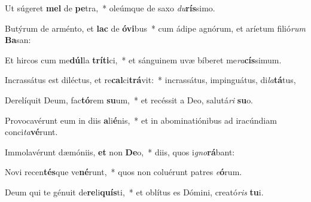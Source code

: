 \item Ut súgeret \textbf{mel} de \textbf{pe}tra,~* oleúmque de saxo \textit{du}\textbf{rís}simo.
\item Butýrum de arménto, et \textbf{lac} de \textbf{ó}\textbf{vi}bus~* cum ádipe agnórum, et aríetum filió\textit{rum} \textbf{Ba}san:
\item Et hircos cum me\textbf{dúl}la \textbf{trí}\textbf{ti}ci,~* et sánguinem uvæ bíberet me\textit{ra}\textbf{cís}simum.
\item Incrassátus est diléctus, et re\textbf{cal}ci\textbf{trá}vit:~* incrassátus, impinguátus, di\textit{la}\textbf{tá}tus,
\item Derelíquit Deum, fac\textbf{tó}rem \textbf{su}um,~* et recéssit a Deo, salutá\textit{ri} \textbf{su}o.
\item Provocavérunt eum in diis \textbf{a}li\textbf{é}nis,~* et in abominatiónibus ad iracúndiam conci\textit{ta}\textbf{vé}runt.
\item Immolavérunt dæmóniis, \textbf{et} non \textbf{De}o,~* diis, quos i\textit{gno}\textbf{rá}bant:
\item Novi recen\textbf{tés}que ve\textbf{né}runt,~* quos non coluérunt patres \textit{e}\textbf{ó}rum.
\item Deum qui te génuit de\textbf{re}li\textbf{quís}ti,~* et oblítus es Dómini, creató\textit{ris} \textbf{tu}i.
